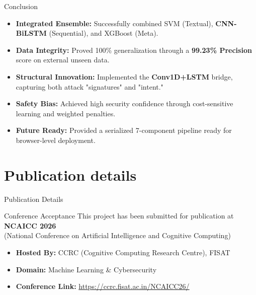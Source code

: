 \documentclass[aspectratio=169,xcolor=dvipsnames]{beamer}
\begin{document}
\begin{frame}{Conclusion}
\begin{itemize}
    \item \textbf{Integrated Ensemble:} Successfully combined SVM (Textual), \textbf{CNN-BiLSTM} (Sequential), and XGBoost (Meta).
    \item \textbf{Data Integrity:} Proved 100\% generalization through a \textbf{99.23\% Precision} score on external unseen data.
    \item \textbf{Structural Innovation:} Implemented the \textbf{Conv1D+LSTM} bridge, capturing both attack "signatures" and "intent."
    \item \textbf{Safety Bias:} Achieved high security confidence through cost-sensitive learning and weighted penalties.
    \item \textbf{Future Ready:} Provided a serialized 7-component pipeline ready for browser-level deployment.
\end{itemize}
\end{frame}

\section{Publication details}
\begin{frame}{Publication Details}
    \begin{block}{Conference Acceptance}
        \centering
        This project has been submitted for publication at \\
        \vspace{0.1cm}
        \textbf{NCAICC 2026} \\
        (National Conference on Artificial Intelligence and Cognitive Computing)
    \end{block}
    \vspace{0.4cm}
    \begin{itemize}
        \item \textbf{Hosted By:} CCRC (Cognitive Computing Research Centre), FISAT
        \item \textbf{Domain:} Machine Learning \& Cybersecurity
        \item \textbf{Conference Link:} \url{https://ccrc.fisat.ac.in/NCAICC26/}
    \end{itemize}
    \vspace{0.4cm}
\end{frame}
\end{document}
